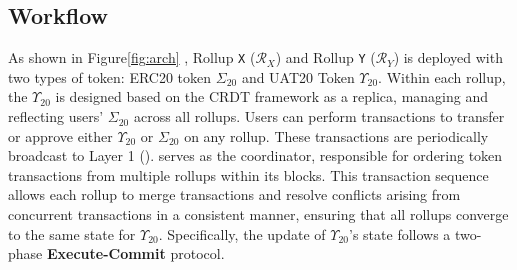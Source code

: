 





    







\subsection{Workflow}

As shown in Figure\ref{fig:arch} , Rollup \texttt{X} ($\mathcal{R}_X$) and Rollup \texttt{Y} ($\mathcal{R}_Y$) is deployed with two types of token: ERC20 token $\Sigma_{20}$ and UAT20 Token $\Upsilon_{20}$. Within each rollup, the $\Upsilon_{20}$ is designed based on the CRDT framework as a replica, managing and reflecting users' $\Sigma_{20}$ across all rollups. 
Users can perform transactions to transfer or approve either $\Upsilon_{20}$ or $\Sigma_{20}$ on any rollup.
These transactions are periodically broadcast to Layer 1 (\ethereum). \ethereum serves as the coordinator, responsible for ordering token transactions from multiple rollups within its blocks. 
This transaction sequence allows each rollup to merge transactions and resolve conflicts arising from concurrent transactions in a consistent manner, ensuring that all rollups converge to the same state for $\Upsilon_{20}$. Specifically, the update of $\Upsilon_{20}$'s state follows a two-phase \textbf{Execute-Commit} protocol.









